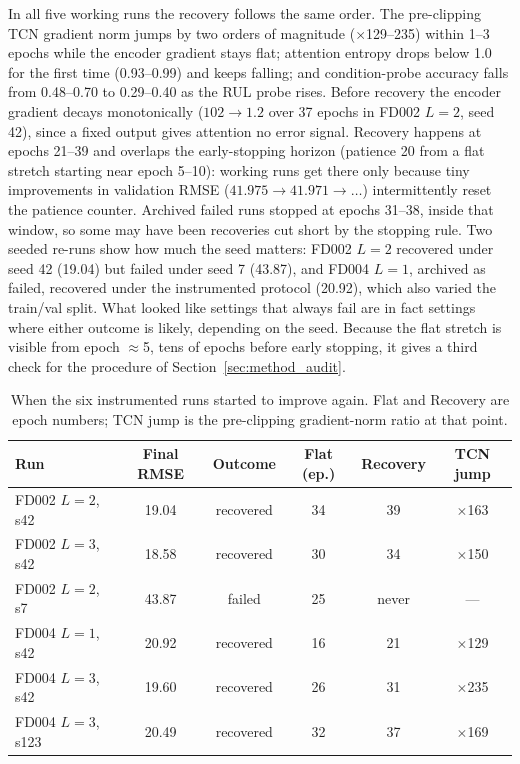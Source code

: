 In all five working runs the recovery follows the same order. The
pre-clipping TCN gradient norm jumps by two orders of magnitude
($\times$129--235) within 1--3 epochs while the encoder gradient stays
flat; attention entropy drops below 1.0 for the first time (0.93--0.99) and
keeps falling; and condition-probe accuracy falls from 0.48--0.70 to
0.29--0.40 as the RUL probe rises. Before recovery the encoder gradient
decays monotonically ($102\to1.2$ over 37 epochs in FD002 $L{=}2$, seed 42),
since a fixed output gives attention no error signal. Recovery happens at
epochs 21--39 and overlaps the early-stopping horizon (patience 20 from a
flat stretch starting near epoch 5--10): working runs get there only because
tiny improvements in validation RMSE ($41.975\to41.971\to\dots$)
intermittently reset the patience counter. Archived failed runs stopped at
epochs 31--38, inside that window, so some may have been recoveries cut
short by the stopping rule. Two seeded re-runs show how much the seed
matters: FD002 $L{=}2$ recovered under seed 42 (19.04) but failed under seed
7 (43.87), and FD004 $L{=}1$, archived as failed, recovered under the
instrumented protocol (20.92), which also varied the train/val split. What
looked like settings that always fail are in fact settings where either
outcome is likely, depending on the seed. Because the flat stretch is
visible from epoch $\approx$5, tens of epochs before early stopping, it gives
a third check for the procedure of Section~\ref{sec:method_audit}.

\begin{table}[t]
\centering\footnotesize
\caption{When the six instrumented runs started to improve again. Flat and
Recovery are epoch numbers; TCN jump is the pre-clipping gradient-norm ratio
at that point.}
\label{tab:escape}
\begin{tabularx}{\linewidth}{XCCCCC}
\toprule
Run & Final RMSE & Outcome & Flat (ep.) & Recovery & TCN jump \\
\midrule
FD002 $L{=}2$, s42 & 19.04 & recovered & 34 & 39 & $\times$163 \\
FD002 $L{=}3$, s42 & 18.58 & recovered & 30 & 34 & $\times$150 \\
FD002 $L{=}2$, s7 & 43.87 & failed & 25 & never & --- \\
FD004 $L{=}1$, s42 & 20.92 & recovered & 16 & 21 & $\times$129 \\
FD004 $L{=}3$, s42 & 19.60 & recovered & 26 & 31 & $\times$235 \\
FD004 $L{=}3$, s123 & 20.49 & recovered & 32 & 37 & $\times$169 \\
\bottomrule
\end{tabularx}
\end{table}

